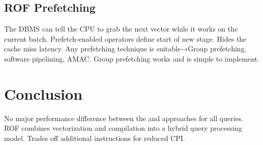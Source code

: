\documentclass[11pt]{article}
\begin{document}
\subsection*{ROF Prefetching}
The DBMS can tell the CPU to grab the next vector while it works on the current batch. Prefetch-enabled operators define start of new stage. Hides the cache miss latency.
Any prefetching technique is suitable→Group prefetching, software pipelining, AMAC. Group prefetching works and is simple to implement.

\section{Conclusion}
No major performance difference between the  and  approaches for all queries. 
ROF combines vectorization and compilation into a hybrid query processing model. Trades off additional instructions for reduced CPI.
\newpage


\end{document}
